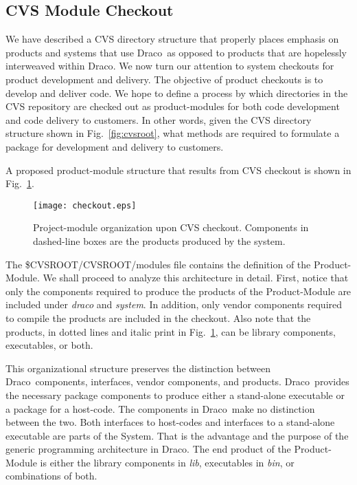 \documentclass[11pt]{../tex/rnote}
\newcommand{\draco}{\textsf{Draco}}
\newcommand{\pkg}[1]{\textsf{#1}}
\newcommand{\dir}[1]{\textsl{#1}}
\begin{document}
\subsection{CVS Module Checkout}

We have described a CVS directory structure that properly places
emphasis on products and systems that use \draco\ as opposed to
products that are hopelessly interweaved within \draco.  We now turn
our attention to system checkouts for product development and
delivery.  The objective of product checkouts is to develop and
deliver code.  We hope to define a process by which directories in
the CVS repository are checked out as product-modules for both code
development and code delivery to customers.  In other words, given the
CVS directory structure shown in Fig.~\ref{fig:cvsroot}, what methods
are required to formulate a package for development and delivery to
customers.

A proposed product-module structure that results from CVS
checkout is shown in Fig.~\ref{fig:checkout}.
\begin{figure}
  \centerline{\texttt{[image: checkout.eps]}}
  \caption{Project-module organization upon CVS checkout.  Components
    in dashed-line boxes are the products produced by the system.}
  \label{fig:checkout}
\end{figure}
The \pkg{\$CVSROOT/CVSROOT/modules} file contains the definition of
the \pkg{Product-Module}.  We shall proceed to analyze this
architecture in detail.  First, notice that only the components
required to produce the products of the \pkg{Product-Module} are
included under \dir{draco} and \dir{system}.  In addition, only vendor
components required to compile the products are included in the
checkout.  Also note that the products, in dotted lines and italic
print in Fig.~\ref{fig:checkout}, can be library components,
executables, or both.

This organizational structure preserves the distinction between
\draco\ components, interfaces, vendor components, and products.
\draco\ provides the necessary package components to produce either a
stand-alone executable or a package for a host-code.  The components
in \draco\ make no distinction between the two.  Both interfaces to
host-codes and interfaces to a stand-alone executable are parts of the
\pkg{System}.  That is the advantage and the purpose of the generic
programming architecture in \draco.  The end product of the
\pkg{Product-Module} is either the library components in \dir{lib},
executables in \dir{bin}, or combinations of both.
\end{document}
